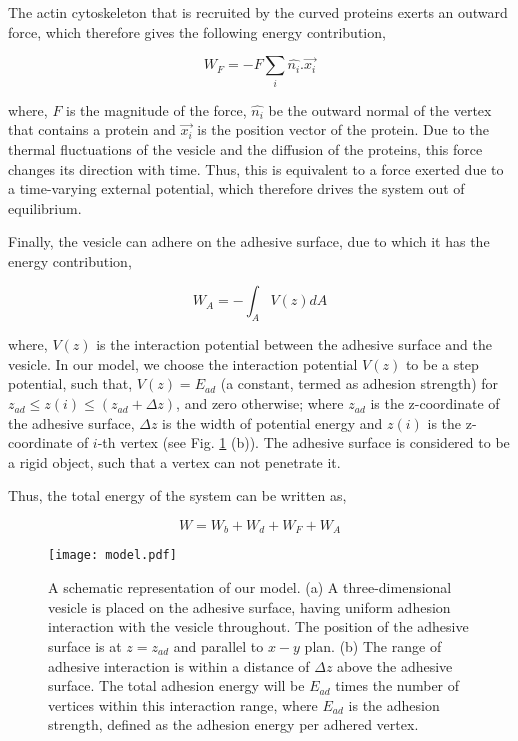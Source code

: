 \documentclass[pre,amsmath]{revtex4}
\begin{document}
The actin cytoskeleton that is recruited by the curved proteins exerts an outward force, which therefore gives the following energy contribution,

$$W_F = -F \sum_i \hat{n_i}.\overrightarrow{x_i}$$ 

where, $F$ is the magnitude of the force, $\hat {n_i}$ be the outward normal of the vertex that contains a protein and $\overrightarrow{x_i}$ is the position vector of the protein. Due to the thermal fluctuations of the vesicle and the diffusion of the proteins, this force changes its direction with time. Thus, this is equivalent to a force exerted due to a time-varying external potential, which therefore drives the system out of equilibrium.

Finally, the vesicle can adhere on the adhesive surface, due to which it has the energy contribution,

$$W_A = -\int_{A} V(z) dA $$

where, $V(z)$ is the interaction potential between the adhesive surface and  the vesicle. In our model, we choose the interaction potential $V(z)$ to be a step potential, such that, $V(z) = E_{ad}$ (a constant, termed as adhesion strength) for  $z_{ad} \leq z(i) \leq (z_{ad} + \Delta z)$, and zero otherwise; where $z_{ad}$ is the z-coordinate of the adhesive surface, $\Delta z$ is the width of potential energy and $z(i)$ is the z-coordinate of $i$-th vertex (see Fig. \ref{model} (b)). The adhesive surface is considered to be a rigid object, such that a vertex can not penetrate it. 


Thus, the total energy of the system can be written as,

\begin{equation}
W = W_b + W_d + W_F + W_A
\label{eq:energy}
\end{equation}

\begin{figure}[ht]
\centering
\texttt{[image: model.pdf]}
\caption{A schematic representation of our model. (a) A three-dimensional vesicle is placed on the adhesive surface, having uniform adhesion interaction with the vesicle throughout. The position of the adhesive surface is at $z=z_{ad}$ and parallel to $x-y$ plan. (b) The range of adhesive interaction is within a distance of $\Delta z$ above the adhesive surface.  The total adhesion energy will be $E_{ad}$ times the number of vertices within this interaction range, where $E_{ad}$ is the adhesion strength, defined as the adhesion energy per adhered vertex.}
\label{model} 
\end{figure}
\end{document}

